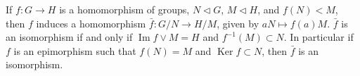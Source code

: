 \begin{theorem}
If $f : G \rightarrow H$ is a homomorphism of groups, $N \triangleleft G$, $M \triangleleft H$, and $f(N) < M$, then $f$ induces a homomorphism $\bar{f} : G/N \rightarrow H/M$, given by $aN \mapsto f(a)M$. $\bar{f}$ is an isomorphism if and only if $\operatorname{Im} f \vee M = H$ and $f^{-1}(M) \subset N$. In particular if $f$ is an epimorphism such that $f(N) = M$ and $\operatorname{Ker} f \subset N$, then $\bar{f}$ is an isomorphism.
\end{theorem}
